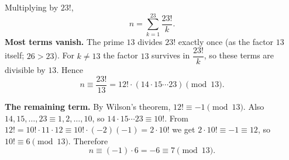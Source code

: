 Multiplying by $23!$,
\[
n=\sum_{k=1}^{23}\dfrac{23!}{k}.
\]
\textbf{Most terms vanish.} The prime $13$ divides $23!$ exactly once (as the factor $13$ itself; $26>23$). For $k\ne13$ the factor $13$ survives in $\dfrac{23!}{k}$, so these terms are divisible by $13$. Hence
\[
n\equiv\dfrac{23!}{13}=12!\cdot(14\cdot15\cdots23)\pmod{13}.
\]

\textbf{The remaining term.} By Wilson's theorem, $12!\equiv-1\pmod{13}$. Also $14,15,\dots,23\equiv1,2,\dots,10$, so $14\cdot15\cdots23\equiv10!$. From $12!=10!\cdot11\cdot12\equiv10!\cdot(-2)(-1)=2\cdot10!$ we get $2\cdot10!\equiv-1\equiv12$, so $10!\equiv6\pmod{13}$. Therefore
\[
n\equiv(-1)\cdot6=-6\equiv\boxed{7}\pmod{13}.
\]
